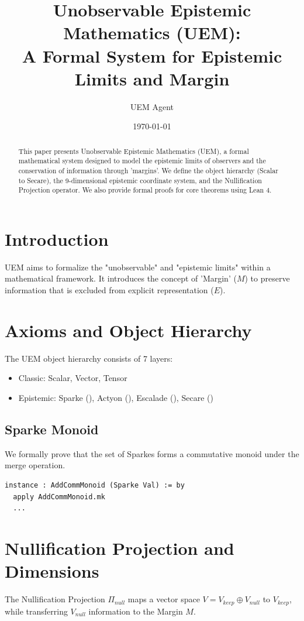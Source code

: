 \documentclass{article}
\title{Unobservable Epistemic Mathematics (UEM): \\ A Formal System for Epistemic Limits and Margin}
\author{UEM Agent}
\date{\today}
\begin{document}
\maketitle

\begin{abstract}
This paper presents Unobservable Epistemic Mathematics (UEM), a formal mathematical system designed to model the epistemic limits of observers and the conservation of information through 'margins'. We define the object hierarchy (Scalar to Secare), the 9-dimensional epistemic coordinate system, and the Nullification Projection operator. We also provide formal proofs for core theorems using Lean 4.
\end{abstract}

\tableofcontents

\section{Introduction}
\label{sec:intro}
UEM aims to formalize the "unobservable" and "epistemic limits" within a mathematical framework. It introduces the concept of 'Margin' ($M$) to preserve information that is excluded from explicit representation ($E$). 

\section{Axioms and Object Hierarchy}
\label{sec:axioms}
The UEM object hierarchy consists of 7 layers:
\begin{itemize}
    \item Classic: Scalar, Vector, Tensor
    \item Epistemic: Sparke (\pentagram), Actyon (\bigcirc), Escalade (\leadsto), Secare (\heartsuit)
\end{itemize}

\subsection{Sparke Monoid}
We formally prove that the set of Sparkes forms a commutative monoid under the merge operation.
\begin{lstlisting}[language=Lean]
instance : AddCommMonoid (Sparke Val) := by
  apply AddCommMonoid.mk
  ...
\end{lstlisting}

\section{Nullification Projection and Dimensions}
\label{sec:nullification}
The Nullification Projection $\Pi_{null}$ maps a vector space $V = V_{keep} \oplus V_{null}$ to $V_{keep}$, while transferring $V_{null}$ information to the Margin $M$.
\end{document}
